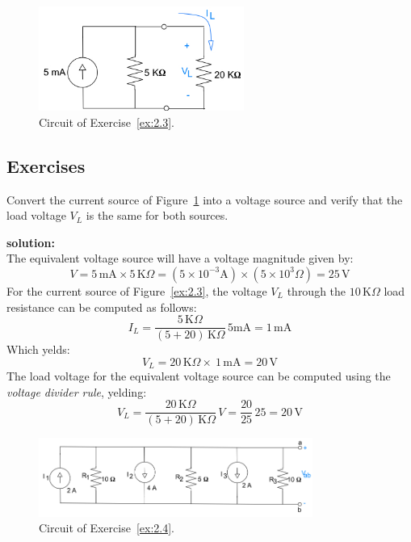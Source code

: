\begin{figure}[h!]
  \centering
  \includegraphics[width=0.6\textwidth]{"images/Fig-17"}
  \caption{Circuit of Exercise~\ref{ex:2.3}.} 
  \label{Fig:Ex:2.3}
\end{figure}
\subsection*{Exercises}

\begin{exercise}
\label{ex:2.3}
Convert the current source of Figure~\ref{Fig:Ex:2.3} into a voltage source and verify that the load voltage $V_L$ is the same for both sources.

\textbf{solution:}\\
The equivalent voltage source will have a voltage magnitude given by:
\[V = 5\,\textrm{mA} \times 5\,\textrm{K}\Omega = (5\times 10^{-3}\textrm{A})\times (5\times 10^3\Omega)= 25\,\textrm{V}\] 
For the current source of Figure~\ref{ex:2.3}, the voltage $V_L$ through the $10\,\textrm{K}\Omega$ load resistance can be computed as follows:
\[I_L = \frac{5\,\textrm{K}\Omega}{(5 + 20)\,\textrm{K}\Omega} \, 5\textrm{mA}=1\,\textrm{mA}\]
Which yelds:
\[V_L = 20\,\textrm{K}\Omega \times\ 1\,\textrm{mA}= 20\,\textrm{V}\]
The load voltage for the equivalent voltage source can be computed using the \emph{voltage divider rule}, yelding:
\[V_L=\frac{20\,\textrm{K}\Omega}{(5 + 20)\,\textrm{K}\Omega}\,V = \frac{20}{25}\,25= 20\,\textrm{V}\]
\end{exercise}

\begin{figure}[h!]
  \centering
  \includegraphics[width=0.8\textwidth]{"images/Fig-18"}
  \caption{Circuit of Exercise~\ref{ex:2.4}.} 
  \label{Fig:Ex:2.4}
\end{figure}
